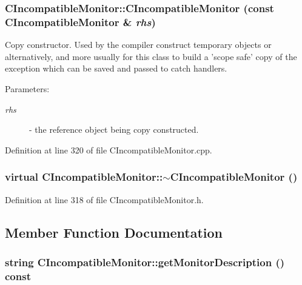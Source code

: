 \subsubsection{\setlength{\rightskip}{0pt plus 5cm}CIncompatible\-Monitor::CIncompatible\-Monitor (const CIncompatible\-Monitor \& {\em rhs})}\label{classCIncompatibleMonitor_a1}


Copy constructor. Used by the compiler construct temporary objects or  alternatively, and more usually for this class to build a 'scope safe' copy of the exception which can be saved and passed to catch handlers. \begin{Desc}
\item[Parameters: ]\par
\begin{description}
\item[{\em 
rhs}]- the reference object being copy constructed. \end{description}
\end{Desc}


Definition at line 320 of file CIncompatible\-Monitor.cpp.
\subsubsection{\setlength{\rightskip}{0pt plus 5cm}virtual CIncompatible\-Monitor::$\sim$CIncompatible\-Monitor ()\hspace{0.3cm}{\tt  [inline, virtual]}}\label{classCIncompatibleMonitor_a2}




Definition at line 318 of file CIncompatible\-Monitor.h.

\subsection{Member Function Documentation}
\subsubsection{\setlength{\rightskip}{0pt plus 5cm}string CIncompatible\-Monitor::get\-Monitor\-Description () const\hspace{0.3cm}{\tt  [inline]}}\label{classCIncompatibleMonitor_a5}




